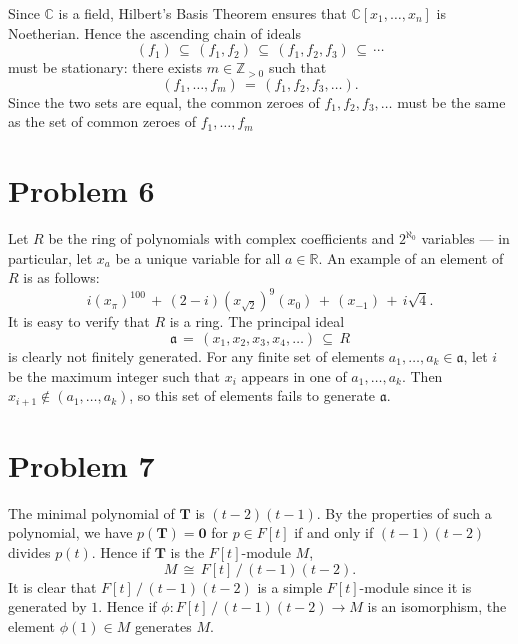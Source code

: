 \documentclass[11pt]{article}
\newcommand{\mat}[1]{\mathbf{#1}}
\begin{document}
Since $\mathbb{C}$ is a field, Hilbert's Basis Theorem ensures that $\mathbb{C}[x_{1}, \ldots, x_{n}]$ is Noetherian. Hence the ascending chain of ideals
\[
  (f_{1}) \, \subseteq \,  (f_{1}, f_{2}) \, \subseteq \,  (f_{1}, f_{2}, f_{3}) \, \subseteq \, \cdots
\]
must be stationary: there exists $m \in \mathbb{Z}_{> 0}$ such that
\[
  (f_{1}, \ldots, f_{m}) \, = \, (f_{1}, f_{2}, f_{3}, \ldots).
\]
Since the two sets are equal, the common zeroes of $f_{1}, f_{2}, f_{3}, \ldots$ must be the same as the set of common zeroes of $f_{1}, \ldots, f_{m}$


\section{Problem 6}

Let $R$ be the ring of polynomials with complex coefficients and $2^{\aleph_{0}}$ variables --- in particular, let $x_{a}$ be a unique variable for all $a \in \mathbb{R}$. An example of an element of $R$ is as follows:
\[
  i (x_{\pi})^{100} \, + \, (2 - i) (x_{\sqrt{2}})^{9} (x_{0}) \, + \, (x_{-1}) \, + \, i\sqrt{4}.
\]
It is easy to verify that $R$ is a ring. The principal ideal
\[
  \mathfrak{a} \, = \, (x_{1}, x_{2}, x_{3}, x_{4}, \ldots) \, \subseteq \, R
\]
is clearly not finitely generated. For any finite set of elements $a_{1}, \ldots, a_{k} \in \mathfrak{a}$, let $i$ be the maximum integer such that $x_{i}$ appears in one of $a_{1}, \ldots, a_{k}$. Then $x_{i + 1} \notin (a_{1}, \ldots, a_{k})$, so this set of elements fails to generate $\mathfrak{a}$.


\section{Problem 7}

The minimal polynomial of $\mat{T}$ is $(t - 2)(t - 1)$. By the properties of such a polynomial, we have $p(\mat{T}) = \mat{0}$ for $p \in F[t]$ if and only if $(t - 1)(t - 2)$ divides $p(t)$. Hence if $\mat{T}$ is the $F[t]$-module $M$,
\[
  M \, \cong \, F[t] \, / \, (t - 1)(t - 2).
\]
It is clear that $F[t] \, / \, (t - 1)(t - 2)$ is a simple $F[t]$-module since it is generated by $1$. Hence if $\phi : F[t] \, / \, (t - 1)(t - 2) \to M$ is an isomorphism, the element $\phi(1) \in M$ generates $M$. 

\end{document}
